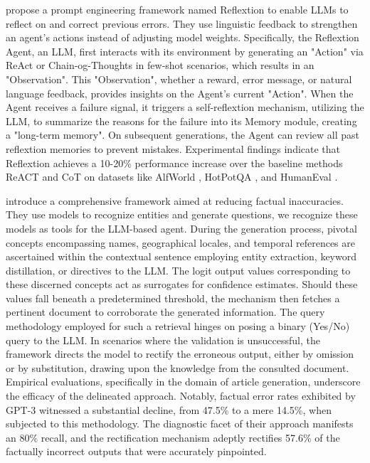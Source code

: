 \citet{shinn2023reflexion} propose a prompt engineering framework named Reflextion to enable LLMs to reflect on and correct previous errors. They use linguistic feedback to strengthen an agent's actions instead of adjusting model weights. Specifically, the Reflextion Agent, an LLM, first interacts with its environment by generating an "Action" via ReAct \citep{yao2023react} or Chain-og-Thoughts \citep{CoT} in few-shot scenarios, which results in an "Observation". This "Observation", whether a reward, error message, or natural language feedback, provides insights on the Agent's current "Action". When the Agent receives a failure signal, it triggers a self-reflextion mechanism, utilizing the LLM, to summarize the reasons for the failure into its Memory module, creating a "long-term memory". On subsequent generations, the Agent can review all past reflextion memories to prevent mistakes. Experimental findings indicate that Reflextion achieves a 10-20\% performance increase over the baseline methods ReACT and CoT on datasets like AlfWorld \citep{alfworld}, HotPotQA \citep{hotpotqa}, and HumanEval \citep{chen2021evaluating}.

\citet{varshney2023stitch} introduce a comprehensive framework aimed at reducing factual inaccuracies. They use models to recognize entities and generate questions, we recognize these models as tools for the LLM-based agent. During the generation process, pivotal concepts encompassing names, geographical locales, and temporal references are ascertained within the contextual sentence employing entity extraction, keyword distillation, or directives to the LLM. The logit output values corresponding to these discerned concepts act as surrogates for confidence estimates. Should these values fall beneath a predetermined threshold, the mechanism then fetches a pertinent document to corroborate the generated information. The query methodology employed for such a retrieval hinges on posing a binary (Yes/No) query to the LLM. In scenarios where the validation is unsuccessful, the framework directs the model to rectify the erroneous output, either by omission or by substitution, drawing upon the knowledge from the consulted document. Empirical evaluations, specifically in the domain of article generation, underscore the efficacy of the delineated approach. Notably, factual error rates exhibited by GPT-3 witnessed a substantial decline, from 47.5\% to a mere 14.5\%, when subjected to this methodology. The diagnostic facet of their approach manifests an 80\% recall, and the rectification mechanism adeptly rectifies 57.6\% of the factually incorrect outputs that were accurately pinpointed.


